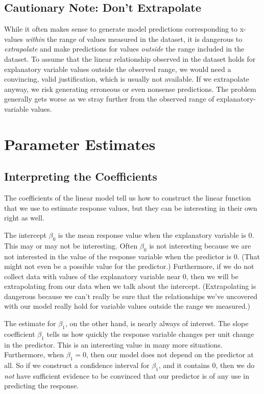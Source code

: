 \documentclass[twoside]{book}\usepackage[]{graphicx}\usepackage[]{xcolor}
\begin{document}
\subsection{Cautionary Note: Don't Extrapolate\!}
While it often makes sense to generate model predictions corresponding to x-values \emph{within} the range of values measured in the dataset, it is dangerous to \emph{extrapolate} and make predictions for values \emph{outside} the range included in the dataset.  To assume that the linear relationship observed in the dataset holds for explanatory variable values outside the observed range, we would need a convincing, valid justification, which is usually not available.  If we extrapolate anyway, we risk generating erroneous or even nonsense predictions.  The problem generally gets worse as we stray further from the observed range of explanatory-variable values.

\section{Parameter Estimates}
\subsection{Interpreting the Coefficients}
The coefficients of the linear model tell us how to construct the linear function
that we use to estimate response values, but they can be interesting in their own
right as well.

The intercept $\beta_0$ is the mean response value when the 
explanatory variable is 0.  This may or may not be interesting.
Often $\beta_0$ is not interesting because we are not interested
in the value of the response variable when the predictor is 0.  (That might not 
even be a possible value for the predictor.)  Furthermore, 
if we do not collect data with values of the explanatory variable near 0, then
we will be extrapolating from our data when we talk about the intercept. (Extrapolating is dangerous because we can't really be sure that the relationships we've uncovered with our model really hold for variable values outside the range we measured.)

The estimate for $\beta_1$, on the other hand, is nearly always of interest.
The slope coefficient $\beta_1$ tells us how quickly the response variable changes 
per unit change in the predictor.  This is an interesting value in many more situations.
Furthermore, when $\beta_1 = 0$, then our model does not depend on the predictor at all.
So if we construct a confidence interval for $\beta_1$, and it contains 0, then we do \emph{not} have sufficient evidence to be convinced that our predictor is of any use in predicting the response.
\end{document}
